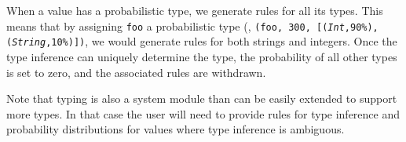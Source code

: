 When a value has a probabilistic type, we generate rules for all its types.
This means that by assigning {\texttt{foo}} a probabilistic type 
(\eg, {\tt (\texttt{foo}, 300, [(\textsl{Int},90\%), 
(\textsl{String},10\%)])},
we would generate rules for both strings and integers.
Once the type inference can uniquely determine the type, 
the probability of all other types is set to zero, 
and the associated rules are withdrawn.

Note that typing is also a system module than 
can be easily extended to support more types. 
In that case the user will need to provide rules for type inference 
and probability distributions for values where type inference is ambiguous.

